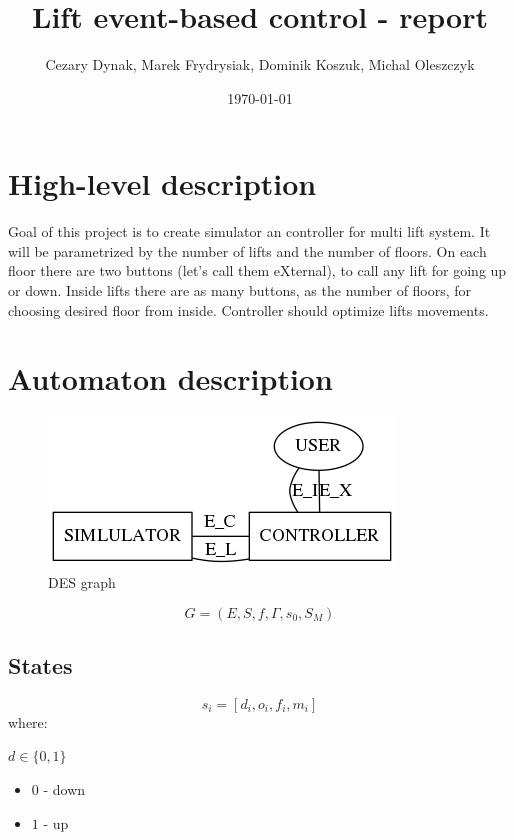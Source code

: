 \documentclass{article}
\begin{document}
\title{Lift event-based control - report}
\author{Cezary Dynak, Marek Frydrysiak, Dominik Koszuk, Michal Oleszczyk} 
\date{\today}
\maketitle

\section{High-level description}

Goal of this project is to create simulator an controller for multi lift
system. It will be parametrized by the number of lifts and the number
of floors. On each floor there are two buttons (let's call them eXternal),
to call any lift for going up or down. Inside lifts there are as many buttons,
as the number of floors, for choosing desired floor from inside. Controller
should optimize lifts movements.

\section{Automaton description}

\begin{figure}
  \centering
  \includegraphics{img/simulator_controller.png}
  \caption{DES graph}
\end{figure}

\[
G = (E, S, f, \Gamma, s_0, S_M)
\]

\subsection{States}

\[
s_i = [d_i, o_i, f_i, m_i]
\]
where:

\(d \in \{0,1\}\)
\begin{itemize}
  \item \(0\) - down
  \item \(1\) - up
\end{itemize}
\end{document}
